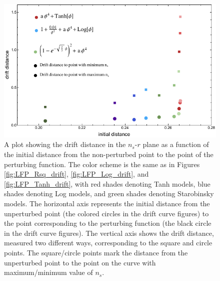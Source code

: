 \documentclass[a4paper,11pt]{article}
\def\nsr{$n_s$-$r$ }
\begin{document}
\begin{figure}[h!]
	\centering
	\includegraphics[width=\textwidth]{figures/LFP_drift_distance_final.pdf}
	\caption[Drift distance vs initial distance.]{A plot showing the drift distance in the \nsr plane as a function of the initial distance from the non-perturbed point to the point of the perturbing function. The color scheme is the same as in Figures \ref{fig:LFP_Rsq_drift}, \ref{fig:LFP_Log_drift}, and \ref{fig:LFP_Tanh_drift}, with red shades denoting Tanh models, blue shades denoting Log models, and green shades denoting Starobinsky models. The horizontal axis represents the initial distance from the unperturbed point (the colored circles in the drift curve figures) to the point corresponding to the perturbing function (the black circle in the drift curve figures). The vertical axis shows the drift distance, measured two different ways, corresponding to the square and circle points. The square/circle points mark the distance from the unperturbed point to the point on the curve with maximum/minimum value of $n_s$.} 
	\label{fig:LFP_drift_distance}
\end{figure}
\end{document}
